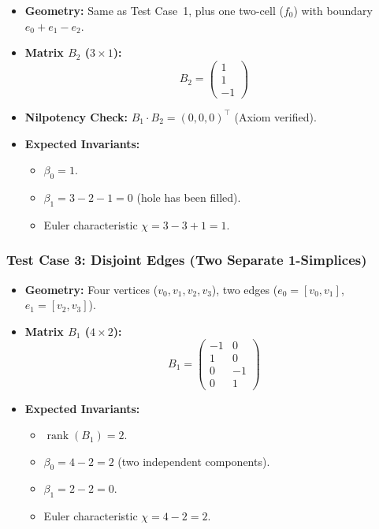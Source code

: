 \documentclass[manuscript, nonacm, review=false]{acmart}
\theoremstyle{definition}
\theoremstyle{plain}
\newcommand{\rank}{\operatorname{rank}}
\begin{document}
\begin{itemize}
    \item \textbf{Geometry:} Same as Test Case~1, plus one two-cell ($f_0$) with boundary $e_0 + e_1 - e_2$.
    \item \textbf{Matrix $B_2$ ($3 \times 1$):}
    \begin{equation}
        B_2 = \begin{pmatrix} 1 \\ 1 \\ -1 \end{pmatrix}
    \end{equation}
    \item \textbf{Nilpotency Check:} $B_1 \cdot B_2 = (0, 0, 0)^\top$ (Axiom verified).
    \item \textbf{Expected Invariants:}
    \begin{itemize}
        \item $\beta_0 = 1$.
        \item $\beta_1 = 3 - 2 - 1 = 0$ (hole has been filled).
        \item Euler characteristic $\chi = 3 - 3 + 1 = 1$.
    \end{itemize}
\end{itemize}

\subsubsection{Test Case 3: Disjoint Edges (Two Separate 1-Simplices)}

\begin{itemize}
    \item \textbf{Geometry:} Four vertices ($v_0, v_1, v_2, v_3$), two edges ($e_0 = [v_0, v_1]$, $e_1 = [v_2, v_3]$).
    \item \textbf{Matrix $B_1$ ($4 \times 2$):}
    \begin{equation}
        B_1 = \begin{pmatrix} -1 & 0 \\ 1 & 0 \\ 0 & -1 \\ 0 & 1 \end{pmatrix}
    \end{equation}
    \item \textbf{Expected Invariants:}
    \begin{itemize}
        \item $\rank(B_1) = 2$.
        \item $\beta_0 = 4 - 2 = 2$ (two independent components).
        \item $\beta_1 = 2 - 2 = 0$.
        \item Euler characteristic $\chi = 4 - 2 = 2$.
    \end{itemize}
\end{itemize}
\end{document}
